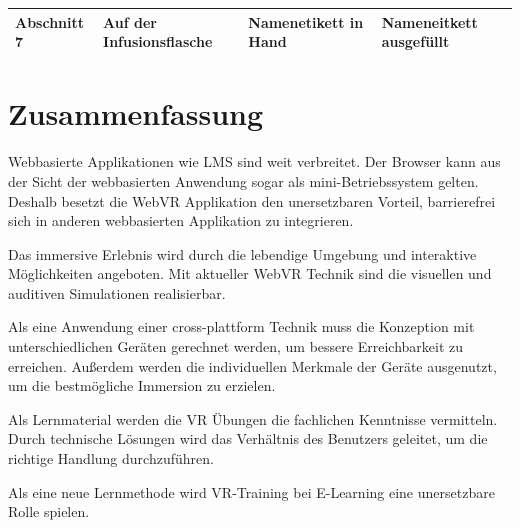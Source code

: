 \begin{table}[]
{\begin{tabular}{llll}
Abschnitt 7 & Auf der Infusionsflasche                                                         & Namenetikett in Hand                                                                                     & Nameneitkett ausgefüllt                                                                                  \\ \hline
\end{tabular}
}
\label{tab:HinweisBox}
\end{table}

  
\section{Zusammenfassung}
Webbasierte Applikationen wie LMS sind weit verbreitet. Der Browser kann aus der Sicht der webbasierten Anwendung sogar als mini-Betriebssystem gelten. Deshalb besetzt die WebVR Applikation den unersetzbaren Vorteil, barrierefrei sich in anderen webbasierten Applikation zu integrieren.

Das immersive Erlebnis wird durch die lebendige Umgebung und interaktive Möglichkeiten angeboten. Mit aktueller WebVR Technik sind die visuellen und auditiven Simulationen realisierbar.

Als eine Anwendung einer cross-plattform Technik muss die Konzeption mit unterschiedlichen Geräten gerechnet werden, um bessere Erreichbarkeit zu erreichen. Außerdem werden die individuellen Merkmale der Geräte ausgenutzt, um die bestmögliche Immersion zu erzielen.

Als Lernmaterial werden die VR Übungen die fachlichen Kenntnisse vermitteln. Durch technische Lösungen wird das Verhältnis des Benutzers geleitet, um die richtige Handlung durchzuführen.

Als eine neue Lernmethode wird VR-Training bei E-Learning eine unersetzbare Rolle spielen.

